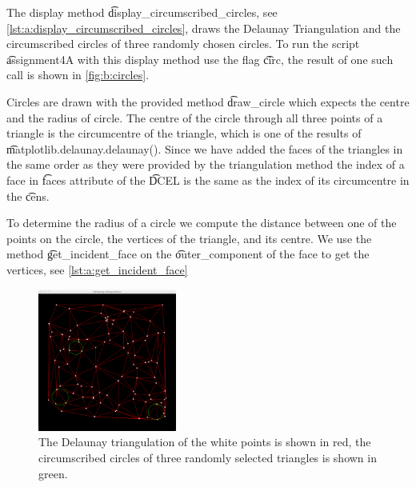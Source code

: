The display method \t{display_circumscribed_circles}, see \autoref{lst:a:display_circumscribed_circles}, draws the Delaunay Triangulation and the circumscribed circles of three randomly chosen circles. To run the script \t{assignment4A} with this display method use the flag \t{circ}, the result of one such call is shown in \autoref{fig:b:circles}.



Circles are drawn with the provided method \t{draw_circle} which expects the centre and the radius of circle. The centre of the circle through all three points of a triangle is the circumcentre of the triangle, which is one of the results of \t{matplotlib.delaunay.delaunay()}. Since we have added the faces of the triangles in the same order as they were provided by the triangulation method the index of a face in \t{faces} attribute of the \t{DCEL} is the same as the index of its circumcentre in the \t{cens}. 

To determine the radius of a circle we compute the distance between one of the points on the circle, the vertices of the triangle, and its centre. We use the method \t{get_incident_face} on the \t{outer_component} of the face to get the vertices, see \autoref{lst:a:get_incident_face}



\begin{figure}
	\centering
	\includegraphics[width=0.405\textwidth]{./img/b_circles}
	\caption{The Delaunay triangulation of the white points is shown in red, the circumscribed circles of three randomly selected triangles is shown in green.}
	\label{fig:b:circles}
\end{figure}